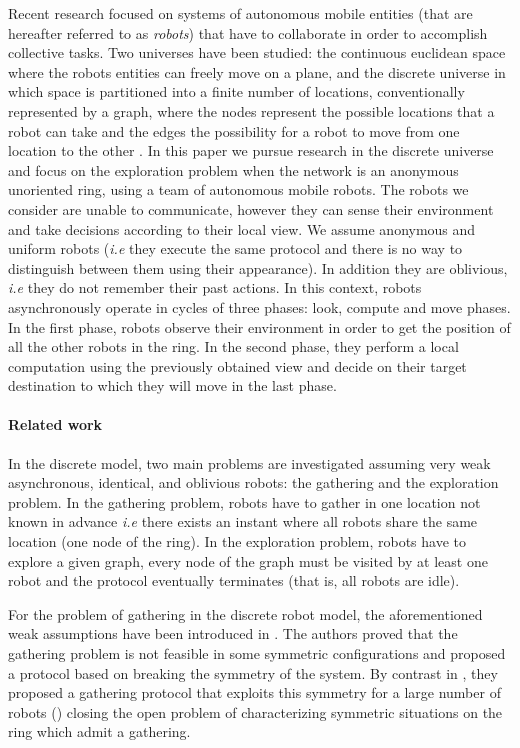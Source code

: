 \documentclass[12pt]{llncs}
\begin{document}
Recent research focused on systems of autonomous mobile entities (that are hereafter referred to as \emph{robots}) that have to collaborate in order to accomplish collective tasks. Two universes have been studied: the continuous euclidean space \cite{paol08,yama99,yoa08} where the robots entities can freely move on a plane, and the discrete universe in which space is partitioned into a finite number of locations, conventionally represented by a graph, where the nodes represent the possible locations that a robot can take and the edges the possibility for a robot to move from one location to the other \cite{paola04,kowa04,marc06,das07,klas08,Ralf08,davi07,davi08,stap09}. In this paper we pursue research in the discrete universe and focus on the exploration problem when the network is an anonymous unoriented ring, using a team of autonomous mobile robots. The robots we consider are unable to communicate, however they can sense their environment and take decisions according to their local view. We assume anonymous and uniform robots (\textit{i.e} they execute the same protocol and there is no way to distinguish between them using their appearance). In addition they are oblivious, \textit{i.e} they do not remember their past actions.  
In this context, robots asynchronously operate in cycles of three phases: look, compute and move phases. In the first phase, robots observe their environment in order to get the position of all the other robots in the ring. In the second phase, they perform a local computation using the previously obtained view and decide on their target destination to which they will move in the last phase. 

\paragraph{\textbf{Related work}}\label{sec:relWork}

In the discrete model, two main problems are investigated assuming very weak asynchronous, identical, and oblivious robots: the gathering and the exploration problem. In the gathering problem, robots have to gather in one location not known in advance \textit{i.e} there exists an instant  where all robots share the same location (one node of the ring). In the exploration problem, robots have to explore a given graph, every node of the graph must be visited by at least one robot and the protocol eventually terminates (that is, all robots are idle). 

For the problem of gathering in the discrete robot model, the aforementioned weak assumptions have been introduced in \cite{klas08}. The authors proved that the gathering problem is not feasible in some symmetric configurations and proposed a protocol based on breaking the symmetry of the system. By contrast in \cite{Ralf08}, they proposed a gathering protocol that exploits this symmetry for a large number of robots () closing the open problem of characterizing symmetric situations on the ring which admit a gathering. 
\end{document}
